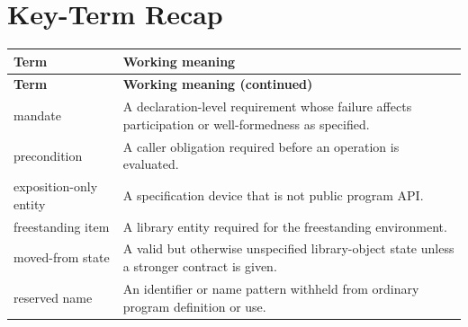 \documentclass[11pt,letterpaper]{article}
\begin{document}
\section{Key-Term Recap}
\begin{longtable}{@{}>{\RaggedRight\arraybackslash}p{}>{\RaggedRight\arraybackslash}p{}@{}}\toprule\textbf{Term} & \textbf{Working meaning}\\\midrule\endfirsthead\toprule\textbf{Term} & \textbf{Working meaning (continued)}\\\midrule\endhead\bottomrule\endfoot
mandate & A declaration-level requirement whose failure affects participation or well-formedness as specified.\\
precondition & A caller obligation required before an operation is evaluated.\\
exposition-only entity & A specification device that is not public program API.\\
freestanding item & A library entity required for the freestanding environment.\\
moved-from state & A valid but otherwise unspecified library-object state unless a stronger contract is given.\\
reserved name & An identifier or name pattern withheld from ordinary program definition or use.\\
\end{longtable}
\end{document}
